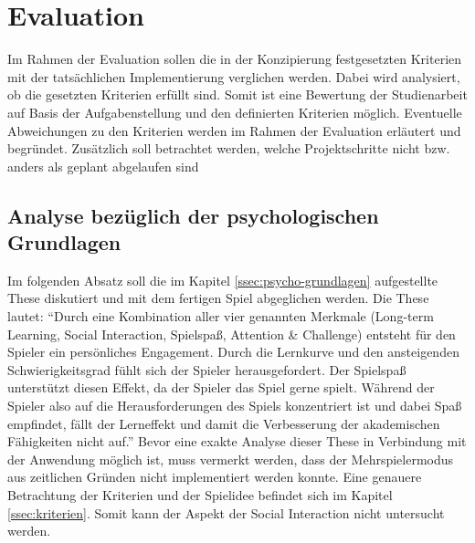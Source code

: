 \section{Evaluation}
    Im Rahmen der Evaluation sollen die in der Konzipierung festgesetzten Kriterien mit der tatsächlichen Implementierung verglichen werden. Dabei wird analysiert, ob die gesetzten Kriterien erfüllt sind. Somit ist eine Bewertung der Studienarbeit auf Basis der Aufgabenstellung und den definierten Kriterien möglich.
    Eventuelle Abweichungen zu den Kriterien werden im Rahmen der Evaluation erläutert und begründet. Zusätzlich soll betrachtet werden, welche Projektschritte nicht bzw. anders als geplant abgelaufen sind

\subsection{Analyse bezüglich der psychologischen Grundlagen}
Im folgenden Absatz soll die im Kapitel \ref{ssec:psycho-grundlagen} aufgestellte These diskutiert und mit dem fertigen Spiel abgeglichen werden. Die These lautet:
\enquote{Durch eine Kombination aller vier genannten Merkmale (Long-term Learning, Social Interaction, Spielspaß, Attention \& Challenge) entsteht für den Spieler ein persönliches Engagement. Durch die Lernkurve und den ansteigenden Schwierigkeitsgrad fühlt sich der Spieler herausgefordert. Der Spielspaß unterstützt diesen Effekt, da der Spieler das Spiel gerne spielt. Während der Spieler also auf die Herausforderungen des Spiels konzentriert ist und dabei Spaß empfindet, fällt der Lerneffekt und damit die Verbesserung der akademischen Fähigkeiten nicht auf.}
Bevor eine exakte Analyse dieser These in Verbindung mit der Anwendung möglich ist, muss vermerkt werden, dass der Mehrspielermodus aus zeitlichen Gründen nicht implementiert werden konnte. Eine genauere Betrachtung der Kriterien und der Spielidee befindet sich im Kapitel \ref{ssec:kriterien}. Somit kann der Aspekt der Social Interaction nicht untersucht werden.
